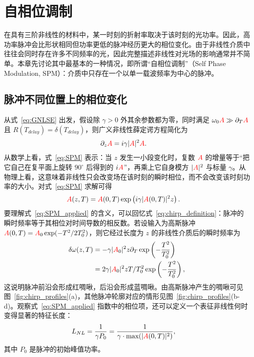 \chapter{自相位调制}
\label{ch:SPM}

在具有三阶非线性的材料中，某一时刻的折射率取决于该时刻的光功率。因此，高功率脉冲会比形状相同但功率更低的脉冲经历更大的相位变化。由于非线性介质中往往会同时存在许多不同频率的光，因此完整描述非线性对光场的影响通常并不简单。本章先讨论其中最基本的一种情况，即所谓“自相位调制”（Self Phase Modulation, SPM）：介质中只存在一个以单一载波频率为中心的脉冲。

\section{脉冲不同位置上的相位变化}
从式~\ref{eq:GNLSE} 出发，假设除 $\gamma>0$ 外其余参数都为零，同时满足 $\omega_0\textcolor{red}{A}\gg\partial_T\textcolor{red}{A}$ 且 $R(T_{delay})=\delta(T_{delay})$，则广义非线性薛定谔方程简化为
\begin{align}
\label{eq:SPM}
    \partial_z\textcolor{red}{A} &= i\gamma|\textcolor{red}{A}|^2\textcolor{red}{A}.
\end{align}
从数学上看，式~\ref{eq:SPM} 表示：当 $z$ 发生一小段变化时，复数 $\textcolor{red}{A}$ 的增量等于“把它自己在复平面上旋转 $90^\circ$ 后得到的 $i\textcolor{red}{A}$”，再乘上它自身模方 $|\textcolor{red}{A}|^2$ 与标量 $\gamma$。从物理上看，这意味着非线性只会改变场在该时刻的瞬时相位，而不会改变该时刻功率的大小。对式~\ref{eq:SPM} 求解可得
\begin{align}
    \label{eq:SPM_applied}
    \textcolor{red}{A}(z,T)&= \textcolor{red}{A}(0,T)\exp\left( i\gamma|\textcolor{red}{A}(0,T)|^2z \right).
\end{align}
要理解式~\ref{eq:SPM_applied} 的含义，可以回忆式~\ref{eq:chirp_definition}：脉冲的瞬时频率等于其相位对时间导数的相反数。若设输入为高斯脉冲 $\textcolor{red}{A}(0,T)=\textcolor{red}{A}_0\exp(-T^2/2T_0^2)$，则它经过长度为 $z$ 的非线性介质后的瞬时频率为
\begin{align}
\label{eq:SPM_example}
    \delta\omega(z,T) &= -\gamma |\textcolor{red}{A}_0|^2 z\partial_T \exp\left(-\frac{T^2}{T_0^2}\right)\\ \nonumber
    &= 2\gamma |\textcolor{red}{A}_0|^2 z T/T_0^2 \exp\left(-\frac{T^2}{T_0^2}\right),
\end{align}
这说明脉冲前沿会形成红啁啾，后沿会形成蓝啁啾。由高斯脉冲产生的啁啾可见图~\ref{fig:chirp_profiles}(a)，其他脉冲轮廓对应的情形见图~\ref{fig:chirp_profiles}(b-d)。观察式~\ref{eq:SPM_applied} 指数中的相位项，还可以定义一个表征非线性何时变得显著的特征长度：
\begin{align}
    L_{NL} &= \frac{1}{\gamma P_0} = \frac{1}{\gamma\cdot\text{max}(|\textcolor{red}{A}(0,T)|^2) },
\end{align}
其中 $P_0$ 是脉冲的初始峰值功率。

